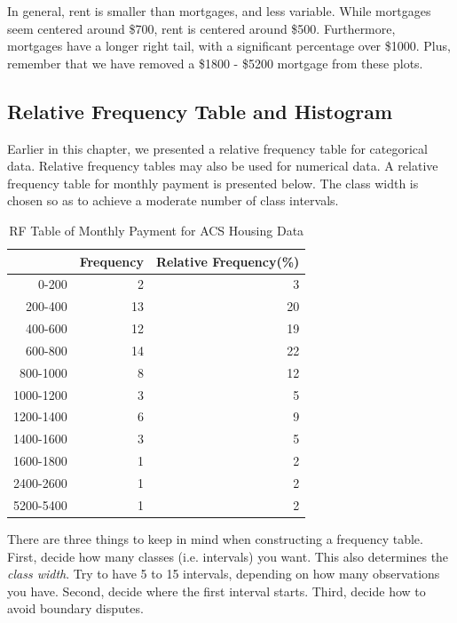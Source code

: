 \documentclass[11pt, chapterprefix=true]{scrbook}\usepackage[]{graphicx}\usepackage[]{color}
\begin{document}
In general, rent is smaller than mortgages, and less variable.  While mortgages seem centered around \$700, rent is centered around \$500.  Furthermore, mortgages have a longer right tail, with a significant percentage over \$1000.  Plus, remember that we have removed a \$1800 - \$5200 mortgage from these plots.

\subsection{Relative Frequency Table and Histogram}

Earlier in this chapter, we presented a relative frequency table for categorical data.  Relative frequency tables may also be used for numerical data.  A relative frequency table for monthly payment is presented below.  The class width is chosen so as to achieve a moderate number of class intervals.

{\small{
\begin{table}[ht]
\centering
\begin{tabular}{rrr}
  \hline
 & Frequency & Relative Frequency(\%) \\ 
  \hline
0-200 & 2 & 3 \\ 
  200-400 & 13 & 20 \\ 
  400-600 & 12 & 19 \\ 
  600-800 & 14 & 22 \\ 
  800-1000 & 8 & 12 \\ 
  1000-1200 & 3 & 5 \\ 
  1200-1400 & 6 & 9 \\ 
  1400-1600 & 3 & 5 \\ 
  1600-1800 & 1 & 2 \\ 
  2400-2600 & 1 & 2 \\ 
  5200-5400 & 1 & 2 \\ 
   \hline
\end{tabular}
\caption{RF Table of Monthly Payment for ACS Housing Data} 
\end{table}

}}

There are three things to keep in mind when constructing a frequency table. First, decide how many classes (i.e. intervals) you want.  This also determines the \textit{class width}.  Try to have 5 to 15 intervals, depending on how many observations you have. Second, decide where the first interval starts.  Third, decide how to avoid boundary disputes.
\end{document}

